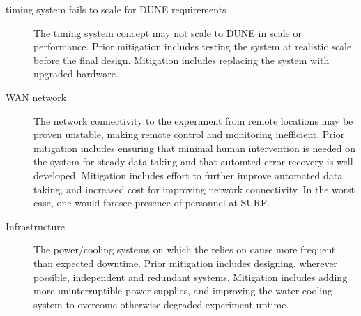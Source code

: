 \begin{description}


\item[ timing system fails to scale for DUNE requirements] The  timing system concept may
  not scale to DUNE in scale or performance.  Prior mitigation
  includes testing the system at realistic scale before the final
  design. Mitigation includes replacing the system with upgraded
  hardware.


\item[WAN network] The network connectivity to the experiment from
  remote locations may be proven unstable, making remote control and monitoring
  inefficient. Prior mitigation includes ensuring that minimal human intervention
  is needed on the system for steady data taking and that automted
  error recovery is well developed. Mitigation includes effort to further
  improve automated data taking, and increased cost for improving network
  connectivity. In the worst case, one would foresee presence of personnel at SURF.

\item[Infrastructure] The power/cooling systems on which the 
  relies on cause more frequent than expected downtime. Prior
  mitigation includes designing, wherever possible, independent and redundant
  systems. Mitigation includes adding more uninterruptible power
  supplies, and improving the water cooling system to overcome otherwise
  degraded experiment uptime. 


\end{description}
